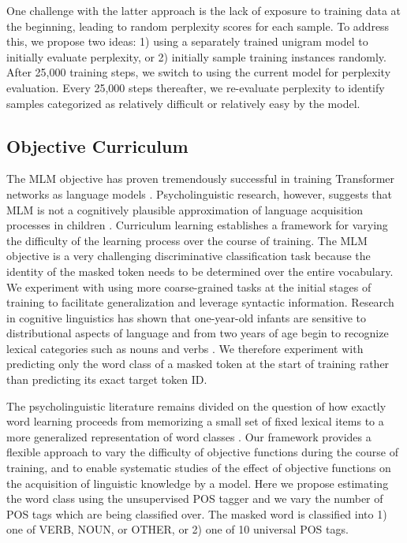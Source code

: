 One challenge with the latter approach is the lack of exposure to training data at the beginning, leading to random perplexity scores for each sample. To address this, we propose two ideas: 1) using a separately trained unigram model to initially evaluate perplexity, or 2) initially sample training instances randomly. After 25,000 training steps, we switch to using the current model for perplexity evaluation. Every 25,000 steps thereafter, we re-evaluate perplexity to identify samples categorized as relatively difficult or relatively easy by the model.

\subsection{Objective Curriculum}
\label{subsec:objective-cl}

The MLM objective has proven tremendously successful in training Transformer networks as language models \cite{devlin2019bert}. Psycholinguistic research, however, suggests that MLM is not a cognitively plausible approximation of language acquisition processes in children \cite{caucheteux2023evidence}.
Curriculum learning establishes a framework for varying the difficulty of the learning process over the course of training. The MLM objective is a very challenging discriminative classification task because the identity of the masked token needs to be determined over the entire vocabulary. We experiment with using more coarse-grained tasks at the initial stages of training to facilitate generalization and leverage syntactic information. Research in cognitive linguistics has shown that one-year-old infants are sensitive to distributional aspects of language and from two years of age begin to recognize lexical categories such as nouns and verbs \citet{alishahi2010computational, gleitman1990structural}. We therefore experiment with predicting only the word class of a masked token at the start of training rather than predicting its exact target token ID. 

The psycholinguistic literature remains divided on the question of how exactly word learning proceeds from memorizing a small set of fixed lexical items to a more generalized representation of word classes \cite{clark2015first}. Our framework provides a flexible approach to vary the difficulty of objective functions during the course of training, and to enable systematic studies of the effect of objective functions on the acquisition of linguistic knowledge by a model.
Here we propose estimating the word class using the unsupervised POS tagger and we vary the number of POS tags which are being classified over. The masked word is classified into 1) one of VERB, NOUN, or OTHER, or 2) one of 10 universal POS tags. 

